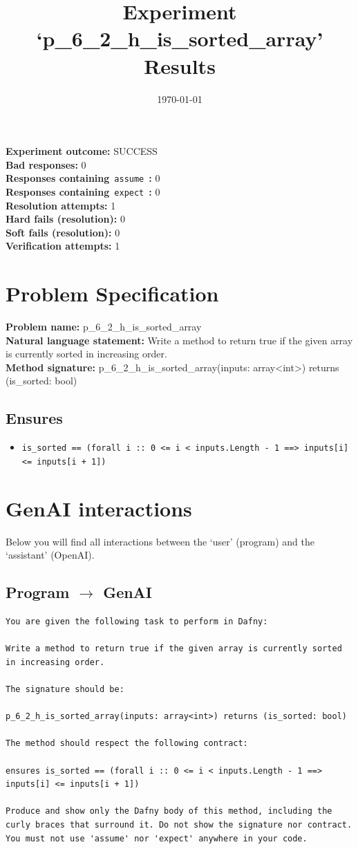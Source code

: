 \documentclass{article}
\begin{document}
\title{Experiment `p\_6\_2\_h\_is\_sorted\_array' Results}
\author{\today}
\date{}
\maketitle
\textbf{Experiment outcome: }SUCCESS
\\\textbf{Bad responses: }0
\\\textbf{Responses containing}~\texttt{assume}~\textbf{: }0
\\\textbf{Responses containing}~\texttt{expect}~\textbf{: }0
\\\textbf{Resolution attempts: }1
\\\textbf{Hard fails (resolution): }0
\\\textbf{Soft fails (resolution): }0
\\\textbf{Verification attempts: }1
\section*{Problem Specification}
\textbf{Problem name: }p\_6\_2\_h\_is\_sorted\_array
\\\textbf{Natural language statement: }Write a method to return true if the given array is currently sorted in increasing order.
\\\textbf{Method signature: }p\_6\_2\_h\_is\_sorted\_array(inputs: array<int>) returns (is\_sorted: bool)
\subsection*{Ensures}
\begin{itemize}
\item \texttt{is\_sorted == (forall i :: 0 <= i < inputs.Length - 1 ==> inputs[i] <= inputs[i + 1])}
\end{itemize}
\clearpage
\section*{GenAI interactions}
Below you will find all interactions between the `user' (program) and the `assistant' (OpenAI).
\subsection*{Program $\rightarrow$ GenAI}
\begin{lstlisting}
You are given the following task to perform in Dafny:

Write a method to return true if the given array is currently sorted in increasing order.

The signature should be:

p_6_2_h_is_sorted_array(inputs: array<int>) returns (is_sorted: bool)

The method should respect the following contract:

ensures is_sorted == (forall i :: 0 <= i < inputs.Length - 1 ==> inputs[i] <= inputs[i + 1])

Produce and show only the Dafny body of this method, including the curly braces that surround it. Do not show the signature nor contract. You must not use 'assume' nor 'expect' anywhere in your code.
\end{lstlisting}
\end{document}
